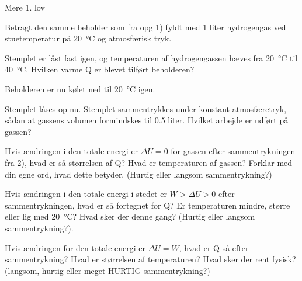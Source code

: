 \documentclass[crop=false, class=memoir]{standalone}
\begin{document}
\begin{opgave}{Mere 1. lov}

\noindent
Betragt den samme beholder som fra opg 1) fyldt med 1 liter hydrogengas ved stuetemperatur på \SI{20}{\celsius} og atmosfærisk tryk.

\opg Stemplet er låst fast igen, og temperaturen af hydrogengassen hæves fra \SI{20}{\celsius} til \SI{40}{\celsius}. Hvilken varme Q er blevet tilført beholderen?

\noindent
Beholderen er nu kølet ned til \SI{20}{\celsius} igen.

\opg Stemplet låses op nu. Stemplet sammentrykkes under konstant atmosfæretryk, sådan at gassens volumen formindskes til 0.5 liter. Hvilket arbejde er udført på gassen?

\opg Hvis ændringen i den totale energi er $\Delta U = 0$ for gassen efter sammentrykningen fra 2), hvad er så størrelsen af Q? Hvad er temperaturen af gassen? Forklar med din egne ord, hvad dette betyder. (Hurtig eller langsom sammentrykning?)

\opg Hvis ændringen i den totale energi i stedet er $W > \Delta U >0$ efter sammentrykningen, hvad er så fortegnet for Q? Er temperaturen mindre, større eller lig med \SI{20}{\celsius}? Hvad sker der denne gang? (Hurtig eller langsom sammentrykning?).

\opg Hvis ændringen for den totale energi er $\Delta U=W$, hvad er Q så efter sammentrykning? Hvad er størrelsen af temperaturen? Hvad sker der rent fysisk? (langsom, hurtig eller meget HURTIG sammentrykning?)

\end{opgave}
\end{document}
